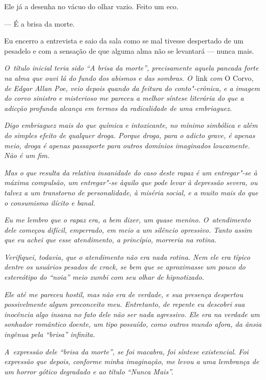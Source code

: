 Ele já a desenha no vácuo do olhar vazio. Feito um eco.

— É a brisa da morte.

Eu encerro a entrevista e saio da sala como se mal tivesse despertado de
um pesadelo e com a sensação de que alguma alma não se levantará ---
nunca mais.

\begin{center}\asterisc{}\end{center}
\begingroup\small

\emph{O~título inicial teria sido ``A brisa da morte'', precisamente aquela
pancada forte na alma que ouvi lá do fundo dos abismos e das sombras. O}~link \emph{com} O Corvo\emph{, de Edgar Allan Poe, veio depois quando da feitura do
conto"-crônica, e a imagem do corvo sinistro e misterioso me pareceu a
melhor síntese literária do que a adicção profunda alcança em termos da
radicalidade de uma embriaguez.}

\emph{Digo embriaguez mais do que química e intoxicante, no mínimo
simbólica e além do simples efeito de qualquer droga. Porque droga, para
o adicto grave, é apenas meio, droga é apenas passaporte para outros
domínios imaginados loucamente. Não é um fim.}

\emph{Mas o que resulta da relativa insanidade do caso deste rapaz é um
entregar"-se à máxima compulsão, um entregar"-se àquilo que pode levar à
depressão severa, ou talvez a um transtorno de personalidade, à miséria
social, e a muito mais do que o consumismo ilícito e banal.}

\emph{Eu me lembro que o rapaz era, a bem dizer, um quase menino. O~atendimento dele começou difícil, emperrado, em meio a um silêncio
opressivo. Tanto assim que eu achei que esse atendimento, a princípio,
morreria na rotina.}

\emph{Verifiquei, todavia, que o atendimento não era nada rotina. Nem
ele era típico dentre os usuários pesados de crack, se bem que se
aproximasse um pouco do estereótipo do ``noia'' meio zumbi com seu olhar
de hipnotizado.}

\emph{Ele até me pareceu hostil, mas não era de verdade, e sua presença
despertou possivelmente algum preconceito meu. Entretanto, de repente eu
descobri sua inocência algo insana no fato dele não ser nada agressivo.
Ele era na verdade um sonhador romântico doente, um tipo possuído, como
outros mundo afora, da ânsia ingênua pela ``brisa'' infinita.}

\emph{A~expressão dele ``brisa da morte'', se foi macabra, foi síntese
existencial. Foi expressão que depois, conforme minha imaginação, me
levou a uma lembrança de um horror gótico degradado e ao título ``Nunca
Mais''.}

